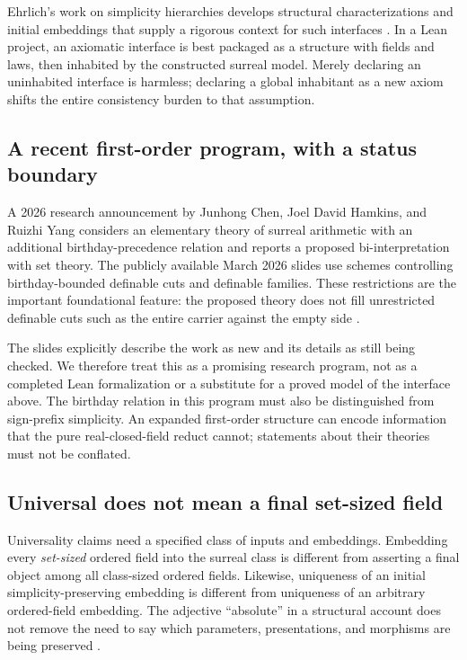 \documentclass[11pt,letterpaper]{article}
\numberwithin{equation}{section}
\theoremstyle{definition}
\theoremstyle{remark}
\begin{document}
Ehrlich's work on simplicity hierarchies develops structural characterizations and initial embeddings that supply a rigorous context for such interfaces \cite{EhrlichHierarchy,EhrlichKaplan}. In a Lean project, an axiomatic interface is best packaged as a structure with fields and laws, then inhabited by the constructed surreal model. Merely declaring an uninhabited interface is harmless; declaring a global inhabitant as a new axiom shifts the entire consistency burden to that assumption.

\subsection{A recent first-order program, with a status boundary}
A 2026 research announcement by Junhong Chen, Joel David Hamkins, and Ruizhi Yang considers an elementary theory of surreal arithmetic with an additional birthday-precedence relation and reports a proposed bi-interpretation with set theory. The publicly available March 2026 slides use schemes controlling birthday-bounded definable cuts and definable families. These restrictions are the important foundational feature: the proposed theory does not fill unrestricted definable cuts such as the entire carrier against the empty side \cite{SurrealArithmetic}.

The slides explicitly describe the work as new and its details as still being checked. We therefore treat this as a promising research program, not as a completed Lean formalization or a substitute for a proved model of the interface above. The birthday relation in this program must also be distinguished from sign-prefix simplicity. An expanded first-order structure can encode information that the pure real-closed-field reduct cannot; statements about their theories must not be conflated.

\subsection{Universal does not mean a final set-sized field}
Universality claims need a specified class of inputs and embeddings. Embedding every \emph{set-sized} ordered field into the surreal class is different from asserting a final object among all class-sized ordered fields. Likewise, uniqueness of an initial simplicity-preserving embedding is different from uniqueness of an arbitrary ordered-field embedding. The adjective ``absolute'' in a structural account does not remove the need to say which parameters, presentations, and morphisms are being preserved \cite{EhrlichHierarchy}.
\end{document}
